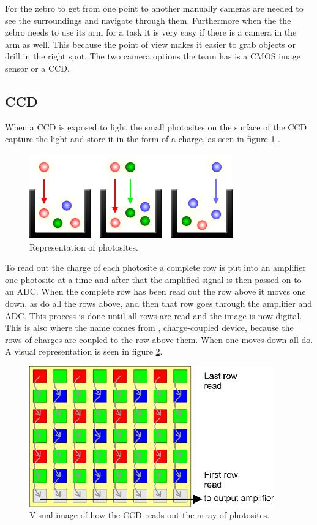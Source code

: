 \documentclass{article}
\begin{document}
For the zebro to get from one point to another manually cameras are needed to see the surroundings and navigate through them. Furthermore when the the zebro needs to use its arm for a task it is very easy if there is a camera in the arm as well. This because the point of view makes it easier to grab objects or drill in the right spot. The two camera options the team has is a CMOS image sensor or a CCD.



\subsection{CCD}

When a CCD is exposed to light the small photosites on the surface of the CCD capture the light and store it in the form of a charge, as seen in figure \ref{ccd1} .

\begin{figure}[H]
	\centering
	\includegraphics[scale=1]{figures/sensors_photosites-mono}
	\caption{Representation of photosites. }
	\label{ccd1}
\end{figure}


To read out the charge of each photosite a complete row is put into an amplifier one photosite at a time and after that the amplified signal is then passed on to an ADC. When the complete row has been read out the row above it moves one down, as do all the rows above, and then that row goes through the amplifier and ADC. This process is done until all rows are read and the image is now digital. This is also where the name comes from , charge-coupled device, because the rows of charges are coupled to the row above them. When one moves down all do. A visual representation is seen in figure \ref{ccd2}.

\begin{figure}[H]
	\centering
	\includegraphics[scale=1]{figures/ccdreadout}
	\caption{Visual image of how the CCD reads out the array of photosites. }
	\label{ccd2}
\end{figure}
\end{document}
